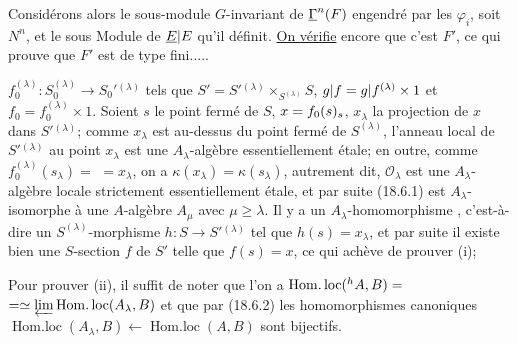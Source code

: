 Considérons alors le sous-module  $G$-invariant de $\underline{\Gamma}^{n}(F)$ engendré par les $\varphi_i$, soit $N^n$, et le sous Module de $\underline E|E$ qu'il définit. \uline{On vérifie} encore que c'est \uline{$F'$}, ce qui prouve que $F'$ est de type fini.....


$f_0^{(\lambda)}:S_0^{(\lambda)}\to S_0'{}^{(\lambda)}$ tels que $S'=S'{}^{(\lambda)}\times_{S^{(\lambda)}}S$, $g|f=g|f^{(\lambda)}\times1$ et $f_0=f_0^{(\lambda)}\times1$.  Soient $s$ le point fermé de $S$, $x=f_0(s)_s$, $x_\lambda$ la projection de $x$ dans $S'{}^{(\lambda)}$; comme $x_\lambda$ est au-dessus du point fermé de $S^{(\lambda)}$, l'anneau local  de $S'{}^{(\lambda)}$ au point $x_\lambda$ est une $A_\lambda$-algèbre essentiellement étale; en outre, comme $f_0^{(\lambda)}(s_\lambda)=$ $=x_\lambda$, on a $\kappa(x_\lambda)=\kappa(s_\lambda)$, autrement dit, $\mathcal O_\lambda$ est une $A_\lambda$-algèbre locale strictement essentiellement étale, et par suite (18.6.1) est $A_\lambda$-isomorphe à une $A$-algèbre $A_\mu$ avec $\mu\geq\lambda$. Il y a  un $A_\lambda$-homomorphisme , c'est-à-dire un $S^{(\lambda)}$-morphisme $h:S\to S'{}^{(\lambda)}$ tel que $h(s)=x_\lambda$, et par suite il existe bien une $S$-section $f$ de $S'$ telle que $f(s)=x$, ce qui achève de prouver (i);

Pour prouver (ii), il suffit de noter que l'on a $\operatorname{Hom.loc}({}^h A,B)=$ $=\simeq\varprojlim\operatorname{Hom.loc}(A_\lambda,B)$ et que par (18.6.2) les homomorphismes canoniques $\operatorname{Hom.loc}(A_\lambda,B)\leftarrow\operatorname{Hom.loc}(A,B)$ sont bijectifs.


